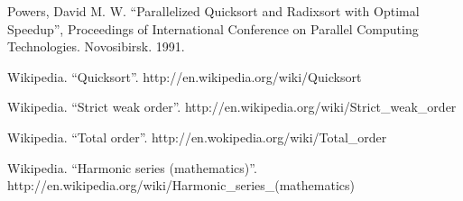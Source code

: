 \documentclass[UTF8]{article}
\begin{document}
\begin{thebibliography}{99}
Powers, David M. W. ``Parallelized Quicksort and Radixsort with Optimal Speedup'', Proceedings of International Conference on Parallel Computing Technologies. Novosibirsk. 1991.

Wikipedia. ``Quicksort''. http://en.wikipedia.org/wiki/Quicksort

Wikipedia. ``Strict weak order''. http://en.wikipedia.org/wiki/Strict\_weak\_order

Wikipedia. ``Total order''. http://en.wokipedia.org/wiki/Total\_order

Wikipedia. ``Harmonic series (mathematics)''. http://en.wikipedia.org/wiki/Harmonic\_series\_(mathematics)

\end{thebibliography}

\ifx\wholebook\relax\else
\end{document}
